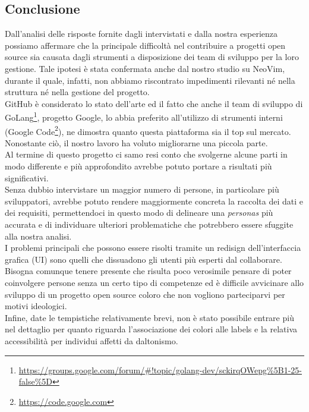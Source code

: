 \documentclass[12pt]{article} %
\begin{document}
\subsection{Conclusione}
Dall'analisi delle risposte fornite dagli intervistati e dalla nostra esperienza possiamo affermare che la principale difficolt\`a nel contribuire a progetti open source sia causata dagli strumenti a disposizione dei team di sviluppo per la loro gestione. Tale ipotesi \`e stata confermata anche dal nostro studio su NeoVim, durante il quale, infatti, non abbiamo riscontrato impedimenti rilevanti n\'e nella struttura n\'e nella gestione del progetto.\\
GitHub \`e considerato lo stato dell'arte ed il fatto che anche il team di sviluppo di GoLang\footnote{\url{https://groups.google.com/forum/#!topic/golang-dev/sckirqOWepg\%5B1-25-false\%5D}}, progetto Google, lo abbia preferito all'utilizzo di strumenti interni (Google Code\footnote{\url{https://code.google.com}}), ne dimostra quanto questa piattaforma sia il top sul mercato. Nonostante ci\`o, il nostro lavoro ha voluto migliorarne una piccola parte.\\
Al termine di questo progetto ci samo resi conto che svolgerne alcune parti in modo differente e pi\`u approfondito avrebbe potuto portare a risultati pi\`u significativi.\\
Senza dubbio intervistare un maggior numero di persone, in particolare pi\`u sviluppatori, avrebbe potuto rendere maggiormente concreta la raccolta dei dati e dei requisiti, permettendoci in questo modo di delineare una \emph{personas} pi\`u accurata e di individuare ulteriori problematiche che potrebbero essere sfuggite alla nostra analisi.\\
I problemi principali che possono essere risolti tramite un redisign dell'interfaccia grafica (UI) sono quelli che dissuadono gli utenti pi\`u esperti dal collaborare. Bisogna comunque tenere presente che risulta poco verosimile pensare di poter coinvolgere persone senza un certo tipo di competenze ed \`e difficile avvicinare allo sviluppo di un progetto open source coloro che non vogliono parteciparvi per motivi ideologici.\\
Infine, date le tempistiche relativamente brevi, non \`e stato possibile entrare pi\`u nel dettaglio per quanto riguarda l'associazione dei colori alle labels e la relativa accessibilit\`a per individui affetti da daltonismo.


\newpage


\end{document}
